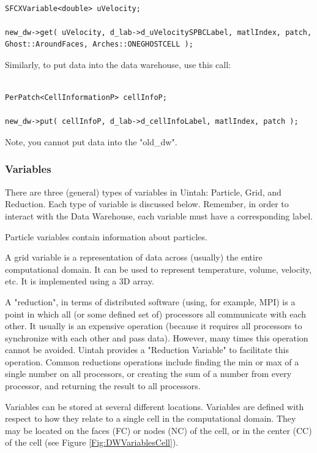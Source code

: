 \documentclass[12pt]{report}
\begin{document}
\begin{verbatim}

SFCXVariable<double> uVelocity;

new_dw->get( uVelocity, d_lab->d_uVelocitySPBCLabel, matlIndex, patch, Ghost::AroundFaces, Arches::ONEGHOSTCELL ); 

\end{verbatim}

Similarly, to put data into the data warehouse, use this call: 

\begin{verbatim}

PerPatch<CellInformationP> cellInfoP;

new_dw->put( cellInfoP, d_lab->d_cellInfoLabel, matlIndex, patch ); 

\end{verbatim}

Note, you cannot put data into the "old\_dw". 

\subsubsection{Variables}

There are three (general) types of variables in Uintah: Particle, Grid, and Reduction. Each type of variable is discussed 
below. Remember, in order to interact with the Data Warehouse, each variable must have a corresponding label. 

Particle variables contain information about particles. 

A grid variable is a representation of data across (usually) the entire computational domain. It can be used to represent 
temperature, volume, velocity, etc. It is implemented using a 3D array. 

A "reduction", in terms of distributed software (using, for example, MPI) is a point in which all (or some defined set of) processors all communicate with each other. It usually is an expensive operation (because it requires all processors to synchronize with each other and pass data). However, many times this operation cannot be avoided. Uintah provides a "Reduction Variable" to facilitate this operation. Common reductions operations include finding the min or max of a single number on all processors, or creating the sum of a number from every processor, and returning the result to all processors. 

Variables can be stored at several different locations. Variables are defined with respect to how they relate to a single cell in the computational domain. They may be located on the faces (FC) or nodes (NC) of the cell, or in the center (CC) of the cell (see Figure \ref{Fig:DWVariablesCell}). 
\end{document}
